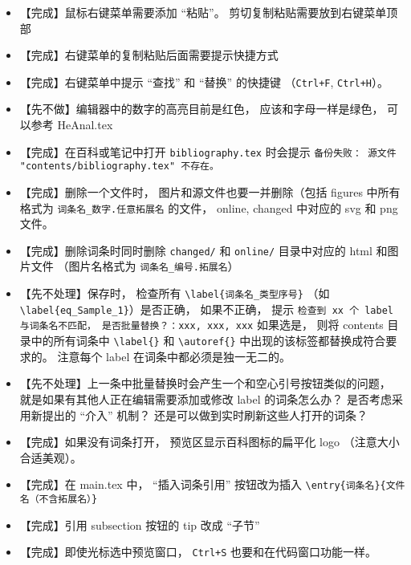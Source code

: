 \begin{itemize}
\item 【完成】鼠标右键菜单需要添加 “粘贴”。 剪切复制粘贴需要放到右键菜单顶部

\item 【完成】右键菜单的复制粘贴后面需要提示快捷方式

\item 【完成】右键菜单中提示 “查找” 和 “替换” 的快捷键 （\verb|Ctrl+F|, \verb|Ctrl+H|）。

\item 【先不做】编辑器中的数字的高亮目前是红色， 应该和字母一样是绿色， 可以参考 HeAnal.tex

\item 【完成】在百科或笔记中打开 \verb|bibliography.tex| 时会提示 \verb|备份失败： 源文件 "contents/bibliography.tex" 不存在。|

\item 【完成】删除一个文件时， 图片和源文件也要一并删除（包括 figures 中所有格式为 \verb|词条名_数字.任意拓展名| 的文件， online, changed 中对应的 svg 和 png 文件。

\item 【完成】删除词条时同时删除 \verb|changed/| 和 \verb|online/| 目录中对应的 html 和图片文件 （图片名格式为 \verb|词条名_编号.拓展名|）

\item 【先不处理】保存时， 检查所有 \verb|\label{词条名_类型序号}| （如 \verb|\label{eq_Sample_1}|）是否正确， 如果不正确， 提示 \verb|检查到 xx 个 label 与词条名不匹配， 是否批量替换？：xxx, xxx, xxx| 如果选是， 则将 contents 目录中的所有词条中 \verb|\label{}| 和 \verb|\autoref{}| 中出现的该标签都替换成符合要求的。 注意每个 label 在词条中都必须是独一无二的。

\item 【先不处理】上一条中批量替换时会产生一个和空心引号按钮类似的问题， 就是如果有其他人正在编辑需要添加或修改 label 的词条怎么办？ 是否考虑采用新提出的 “介入” 机制？ 还是可以做到实时刷新这些人打开的词条？

\item 【完成】如果没有词条打开， 预览区显示百科图标的扁平化 logo （注意大小合适美观）。

\item 【完成】在 main.tex 中， “插入词条引用” 按钮改为插入 \verb|\entry{词条名}{文件名（不含拓展名）}|

\item 【完成】引用 subsection 按钮的 tip 改成 “子节”

\item 【完成】即使光标选中预览窗口， \verb|Ctrl+S| 也要和在代码窗口功能一样。


\end{itemize}
